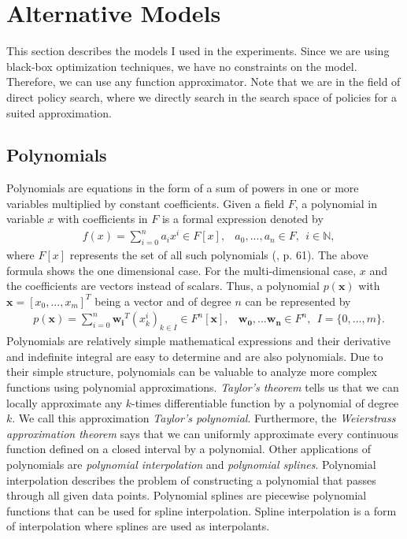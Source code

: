 
\section{Alternative Models}
\label{sec:models}
This section describes the models I used in the experiments. Since we are using black-box optimization techniques, we have no constraints on the model. Therefore, we can use any function approximator. Note that we are in the field of direct policy search, where we directly search in the search space of policies for a suited approximation.

\subsection{Polynomials}
Polynomials are equations in the form of a sum of powers in one or more variables multiplied by constant coefficients. Given a field $F$, a polynomial in variable $x$ with coefficients in $F$ is a formal expression denoted by
\begin{align*}
  &f(x) = \sum_{i=0}^{n} a_i x^i \in F[x], &a_0, ..., a_n \in F, \ \ i \in \mathbb{N},
\end{align*}
where $F[x]$ represents the set of all such polynomials (\cite{fischer2014}, p. 61). The above formula shows the one dimensional case. For the multi-dimensional case, $x$ and the coefficients are vectors instead of scalars. Thus, a polynomial $p(\mathbf{x})$ with $\mathbf{x} = [x_0, ..., x_m]^T$ being a vector and of degree $n$ can be represented by
\begin{align*}
  &p(\mathbf{x}) = \sum_{i=0}^{n} \mathbf{w_i}^T (x_k^i)_{k \in I} \in F^n[\mathbf{x}], &\mathbf{w_0}, ... \mathbf{w_n} \in F^n, \ \ I = \{0, ..., m\}.
\end{align*}
Polynomials are relatively simple mathematical expressions and their derivative and indefinite integral are easy to determine and are also polynomials. Due to their simple structure, polynomials can be valuable to analyze more complex functions using polynomial approximations. \textit{Taylor's theorem} tells us that we can locally approximate any $k$-times differentiable function by a polynomial of degree $k$. We call this approximation \textit{Taylor's polynomial}. Furthermore, the \textit{Weierstrass approximation theorem} says that we can uniformly approximate every continuous function defined on a closed interval by a polynomial. Other applications of polynomials are \textit{polynomial interpolation} and \textit{polynomial splines}. Polynomial interpolation describes the problem of constructing a polynomial that passes through all given data points. Polynomial splines are piecewise polynomial functions that can be used for spline interpolation. Spline interpolation is a form of interpolation where splines are used as interpolants.

